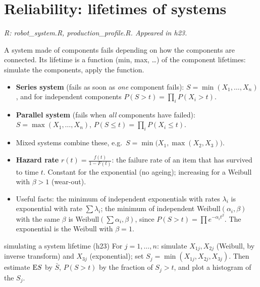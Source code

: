 \section{Reliability: lifetimes of systems}
\textit{R: robot\_system.R, production\_profile.R. Appeared in h23.}

\begin{idea}
A system made of components fails depending on how the components are connected. Its lifetime is a function (min, max, \ldots) of the component lifetimes: simulate the components, apply the function.
\end{idea}

\begin{itemize}
  \item \textbf{Series system} (fails as soon as \emph{one} component fails): $S = \min(X_1,\dots,X_n)$, and for independent components $P(S>t) = \prod_i P(X_i>t)$.
  \item \textbf{Parallel system} (fails when \emph{all} components have failed): $S = \max(X_1,\dots,X_n)$, $P(S\le t) = \prod_i P(X_i\le t)$.
  \item Mixed systems combine these, e.g.\ $S = \min\big(X_1,\max(X_2,X_3)\big)$.
  \item \textbf{Hazard rate} $r(t) = \frac{f(t)}{1-F(t)}$: the failure rate of an item that has survived to time $t$. Constant for the exponential (no ageing); increasing for a Weibull with $\beta>1$ (wear-out).
  \item Useful facts: the minimum of independent exponentials with rates $\lambda_i$ is exponential with rate $\sum\lambda_i$; the minimum of independent Weibull$(\alpha_i,\beta)$ with the same $\beta$ is Weibull$(\sum\alpha_i,\beta)$, since $P(S>t) = \prod e^{-\alpha_i t^\beta}$. The exponential is the Weibull with $\beta=1$.
\end{itemize}

\begin{algo}{simulating a system lifetime (h23)}
For $j = 1,\dots,n$: simulate $X_{1j},X_{2j}$ (Weibull, by inverse transform) and $X_{3j}$ (exponential); set $S_j = \min(X_{1j},X_{2j},X_{3j})$. Then estimate $\mathrm{E} S$ by $\bar S$, $P(S>t)$ by the fraction of $S_j > t$, and plot a histogram of the $S_j$.
\end{algo}

\newpage
